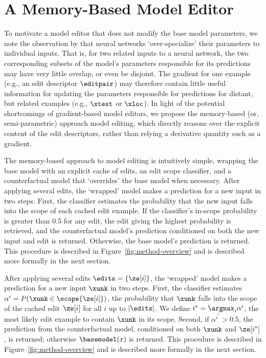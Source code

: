 

\section{A Memory-Based Model Editor}
\label{sec:method}
To motivate a model editor that does not modify the base model parameters, we note the observation by \citet{csordas2021are} that neural networks `over-specialize' their parameters to individual inputs. That is, for two related inputs to a neural network, the two corresponding subsets of the model's parameters responsible for its predictions may have very little overlap, or even be disjoint. The gradient for one example (e.g., an edit descriptor $\editpair$) may therefore contain little useful information for updating the parameters responsible for predictions for distant, but related examples (e.g., $\xtest$ or $\xloc$). In light of the potential shortcomings of gradient-based model editors, we propose the memory-based (or, semi-parametric) approach model editing, which directly reasons over the explicit content of the edit descriptors, rather than relying a derivative quantity such as a gradient.

The memory-based approach to model editing is intuitively simple, wrapping the base model with an explicit cache of edits, an edit scope classifier, and a counterfactual model that `overrides' the base model when necessary. After applying several edits, the `wrapped' model makes a prediction for a new input in two steps. First, the classifier estimates the probability that the new input falls into the scope of each cached edit example. If the classifier's in-scope probability is greater than 0.5 for any edit, the edit giving the highest probability is retrieved, and the counterfactual model's prediction conditioned on both the new input and edit is returned. Otherwise, the base model's prediction is returned. This procedure is described in Figure~\ref{fig:method-overview} and is described more formally in the next section.

After applying several edits $\edits=\{\ze[i]\}$, the `wrapped' model makes a prediction for a new input $\xunk$ in two steps. First, the classifier estimates $\alpha^i = P(\xunk \in \scope{\ze[i]})$, the probability that $\xunk$ falls into the scope of the cached edit $\ze[i]$ for all $i$ up to $|\edits|$. We define $i^* = \argmax_i \alpha^i$, the most likely edit example to contain $\xunk$ in its scope.
Second, if $\alpha^{i^*} > 0.5$, the prediction from the counterfactual model, conditioned on both $\xunk$ and $\ze[i^*]$, is returned; otherwise $\basemodel(x)$ is returned. This procedure is described in Figure~\ref{fig:method-overview} and is described more formally in the next section.

